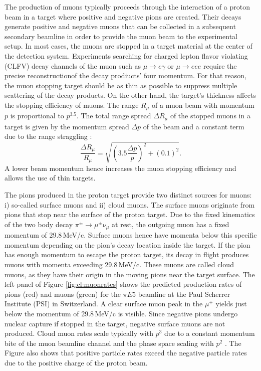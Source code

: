 The production of muons typically proceeds through the interaction of a proton beam in a target where positive and negative pions are created. Their decays generate positive and negative muons that can be collected in a subsequent secondary beamline in order to provide the muon beam to the experimental setup. In most cases, the muons are stopped in a target material at the center of the detection system. Experiments searching for charged lepton flavor violating (CLFV) decay channels of the muon such as $\mu\to e \gamma$ or $\mu \to e e e$ require the precise reconstructionof the decay prodiucts' four momentum. For that reason, the muon stopping target should be as thin as possible to suppress multiple scattering of the decay products. On the other hand, the target's thickness affects the stopping efficiency of muons. The range $R_\mu$ of a muon beam with momentum $p$ is proportional to $p^{3.5}$. The total range spread $\Delta R_\mu$ of the stopped muons in a target is given by the momentum spread $\Delta p$ of the beam and a constant term due to the range straggling \cite{Pifer:1976ia}:
\[
\frac{\Delta R_\mu}{R_\mu} = \sqrt{\left(3.5\frac{\Delta p}{p}\right)^2 + \left(0.1\right)^2}.
\]
A lower beam momentum hence increases the muon stopping efficiency and allows the use of thin targets.

The pions produced in the proton target provide two distinct sources for muons: i) so-called surface muons and ii) cloud muons. The surface muons originate from pions that stop near the surface of the proton target. Due to the fixed kinematics of the two body decay $\pi^\pm \to \mu^\pm \nu_\mu$ at rest, the outgoing muon has a fixed momentum of 29.8\,MeV/c. Surface muons hence have momenta below this specific momentum depending on the pion's decay location inside the target. If the pion has enough momentum to escape the proton target, its decay in flight produces muons with momenta exceeding 29.8\,MeV/c. These muons are called cloud muons, as they have their origin in the moving pions near the target surface. The left panel of Figure \ref{fig:cl:muonrates} shows the predicted production rates of pions (red) and muons (green) for the $\pi E5$ beamline at the Paul Scherrer Institute (PSI) in Switzerland. A clear surface muon peak in the $\mu^+$ yields just below the momentum of 29.8\,MeV/c is visible. Since negative pions undergo nuclear capture if stopped in the target, negative surface muons are not produced. Cloud muon rates scale typically with $p^3$ due to a constant momentum bite of the muon beamline channel and the phase space scaling with $p^2$ \cite{VanDyck:1979xr}. The Figure also shows that positive particle rates exceed the negative particle rates due to the positive charge of the proton beam.  


